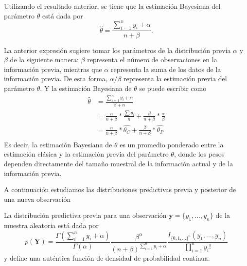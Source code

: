 \documentclass[10pt,openright]{book}\usepackage[]{graphicx}\usepackage[]{color}
\begin{document}
    Utilizando el resultado anterior, se tiene que la estimaci\'on Bayesiana del par\'ametro $\theta$ est\'a dada por
    \begin{equation*}
    \hat{\theta}=\frac{\sum_{i=1}^ny_i+\alpha}{n+\beta}.
    \end{equation*}
    
    La anterior expresi\'on sugiere tomar los par\'ametros de la distribuci\'on previa $\alpha$ y $\beta$ de la siguiente manera: $\beta$ representa el n\'umero de observaciones en la informaci\'on previa, mientras que $\alpha$ representa la suma de los datos de la informaci\'on previa. De esta forma, $\alpha/\beta$ representa la estimaci\'on previa del par\'ametro $\theta$. Y la estimaci\'on Bayesiana de $\theta$ se puede escribir como
    \begin{align*}
    \hat{\theta}&=\frac{\sum_{i=1}^ny_i+\alpha}{\beta+n}\\
    &=\frac{n}{n+\beta}*\frac{\sum y_i}{n}+\frac{\beta}{n+\beta}*\frac{\alpha}{\beta}\\
    &=\frac{n}{n+\beta}*\hat{\theta_C}+\frac{\beta}{n+\beta}*\hat{\theta_P}\\
    \end{align*}
    Es decir, la estimaci\'on Bayesiana de $\theta$ es un promedio ponderado entre la estimaci\'on cl\'asica y la estimaci\'on previa del par\'ametro $\theta$, donde los pesos dependen directamente del tama\~no muestral de la informaci\'on actual y de la informaci\'on previa. 
    
    A continuaci\'on estudiamos las distribuciones predictivas previa y posterior de una nueva observaci\'on 
    \begin{Res}\label{Res1.4.2}
    La distribuci\'on predictiva previa para una observaci\'on $\mathbf{y}=\{y_1,\ldots,y_n\}$ de la muestra aleatoria est\'a dada por
    \begin{equation}\label{Pre_prior_Poisson}
    p(\mathbf{Y})=\frac{\Gamma(\sum_{i=1}^ny_i+\alpha)}{\Gamma(\alpha)}\frac{\beta^\alpha}{(n+\beta)^{\sum_{i=1}^ny_i+\alpha}}
    \frac{I_{\{0,1,\ldots\}^n}(y_1,\ldots,y_n)}{\prod_{i=1}^ny_i!}
    \end{equation}
    y define una aut\'entica funci\'on de densidad de probabilidad continua.
    \end{Res}
    
\end{document}
